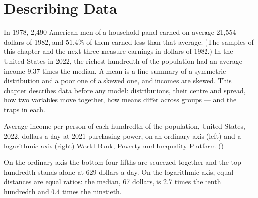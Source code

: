\chapter{Describing Data}\label{ch:b1:describing-data}

In 1978, 2,490 American men of a household panel earned on average 21,554
dollars of 1982, and $51.4\%$ of them earned less than that average. (The
samples of this chapter and the next three measure earnings in dollars of
1982.) %
In the United States in 2022, the richest hundredth of the population had
an average income 9.37 times the median. %
A mean is a fine summary of a symmetric distribution and a poor one of a
skewed one, and incomes are skewed. This chapter describes data before any
model: distributions, their centre and spread, how two variables move
together, how means differ across groups --- and the traps in each.

\begin{openingchart}{Average income per person of each hundredth of the
population, United States, 2022, dollars a day at 2021 purchasing power, on
an ordinary axis (left) and a logarithmic axis (right).}{World Bank, Poverty
and Inequality Platform ()}
\end{openingchart}

On the ordinary axis the bottom four-fifths are squeezed together and the
top hundredth stands alone at 629 dollars a day. On the logarithmic axis,
equal distances are equal ratios: the median, 67 dollars, is 2.7 times the
tenth hundredth and 0.4 times the ninetieth. %

